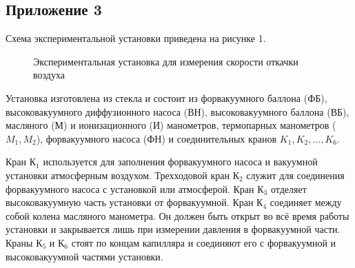 \subsection{Приложение 3} \label{Приложение 3}
Схема экспериментальной установки приведена на рисунке 1.
\begin{figure}[ht]
    \label{figure1}
    \caption{Экспериментальная установка для измерения скорости откачки воздуха}
\end{figure}

Установка изготовлена из стекла и состоит из форвакуумного баллона (ФБ), высоковакуумного диффузионного насоса (ВН), высоковакуумного баллона (ВБ), масляного (М) и ионизационного (И) манометров, термопарных манометров
($M_1, M_2$), форвакуумного насоса (ФН) и соединительных кранов $K_1,
K_2,\dots,K_6$.

Кран $К_1$ используется для заполнения форвакуумного насоса и вакуумной установки атмосферным воздухом. Трехходовой кран $К_2$ служит для соединения форвакуумного насоса с установкой или атмосферой. Кран $К_3$ отделяет высоковакуумную часть установки от форвакуумной. Кран $К_4$ соединяет между собой колена масляного манометра. Он должен быть открыт во всё время работы установки и закрывается лишь при измерении давления в форвакуумной части. Краны $К_5$ и $К_6$ стоят по концам капилляра и соединяют его с форвакуумной и
высоковакуумной частями установки.

